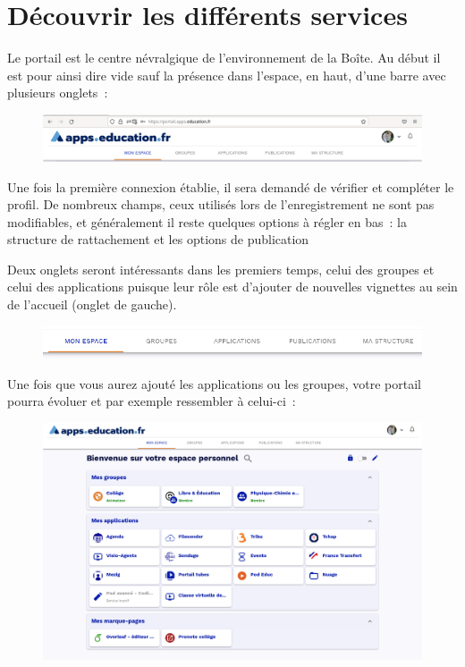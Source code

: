 \chapter{Découvrir les différents services}

Le portail est le centre névralgique de l'environnement de la Boîte. 
Au début il est pour ainsi dire vide sauf la présence dans l'espace, en haut, d'une barre avec plusieurs onglets~:
\begin{figure}
	\centering
	\includegraphics[width=\linewidth]{./Captures/portail.barre.haute.png}
\end{figure}
Une fois la première connexion établie, il sera demandé de vérifier et compléter le profil. 
De nombreux champs, ceux utilisés lors de l'enregistrement ne sont pas modifiables, et généralement il reste quelques options à régler en bas~: la structure de rattachement et les options de publication

Deux onglets seront intéressants dans les premiers temps, celui des groupes et celui des applications puisque leur rôle est d'ajouter de nouvelles vignettes au sein de l'accueil (onglet de gauche).

\begin{figure}
	\centering
	\includegraphics[width=\linewidth]{./Captures/portail.barre.seule.png}
\end{figure}

Une fois que vous aurez ajouté les applications ou les groupes, votre portail pourra évoluer et par exemple ressembler à celui-ci~:
\begin{figure}
	\centering
	\includegraphics[width=0.7071\linewidth]{./Captures/portail.accueil.png}
\end{figure}

